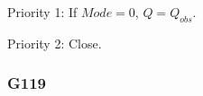 

\begin{packed_items}
\item Priority 1: If $Mode=0$, $Q = Q_{obs}$.
\item Priority 2: Close.
\end{packed_items}



%
%
%

\clearpage

\subsubsection{G119}

